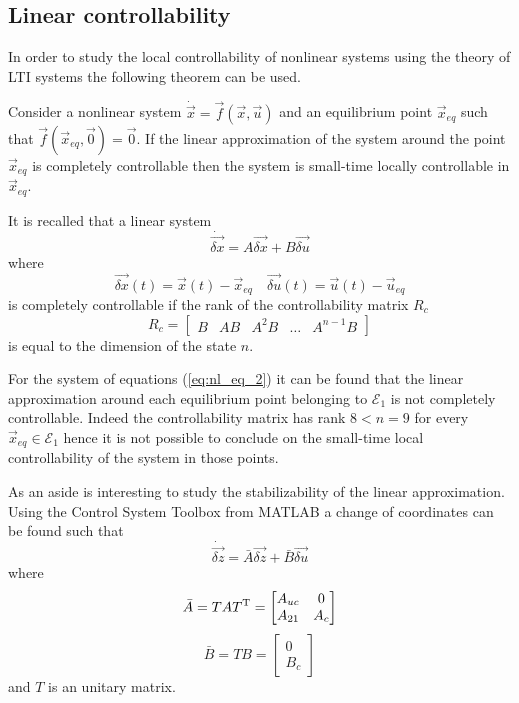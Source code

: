 \subsection{Linear controllability}
In order to study the local controllability of nonlinear systems using the theory of LTI systems
the following theorem can be used.
\begin{theorem}
  Consider a nonlinear system $\dot{\vec{x}} = \vec{f}(\vec{x}, \vec{u})$ and an equilibrium point $\vec{x}_{eq}$
  such that $\vec{f}(\vec{x}_{eq}, \vec{0}) = \vec{0}$. If the linear approximation of the system around
  the point $\vec{x}_{eq}$ is completely controllable then the system is small-time locally controllable
  in $\vec{x}_{eq}$.
\end{theorem}
It is recalled that a linear system
\[
\dot{\vec{\delta x}} = A \vec{\delta x} + B \vec{\delta u}
\]
where
\[
\vec{\delta x}(t) = \vec{x}(t) - \vec{x}_{eq} \quad \vec{\delta u}(t) = \vec{u}(t) - \vec{u}_{eq}
\]
is completely controllable if the rank of the controllability matrix $R_c$ 
\begin{equation}
R_c = 
\begin{bmatrix}
B & AB & A^2B & \dots & A^{n-1}B
\end{bmatrix}
\end{equation}
is equal to the dimension of the state $n$.
\par
For the system of equations (\ref{eq:nl_eq_2}) it can be found that the linear approximation
around each equilibrium point belonging to $\mathcal{E}_{1}$ is not completely controllable.
Indeed the controllability matrix has rank $8 < n = 9$ for every $\vec{x}_{eq} \in \mathcal{E}_1$
hence it is not possible to conclude on the small-time local controllability of the system
in those points.
\par
As an aside is interesting to study the stabilizability of the linear approximation.
Using the Control System Toolbox from MATLAB a change of coordinates can be found such that
\[
\dot{\vec{\delta z}} = \bar{A} \vec{\delta z} + \bar{B} \vec{\delta u}
\]
where
\[
\bar{A} =TAT^{\mathrm{T}} = 
\begin{bmatrix}
  A_{uc} & 0\\
  A_{21} & A_c
\end{bmatrix}
\]
\[
\bar{B} =TB = 
\begin{bmatrix}
0\\
B_c
\end{bmatrix}
\]
and $T$ is an unitary matrix. %
